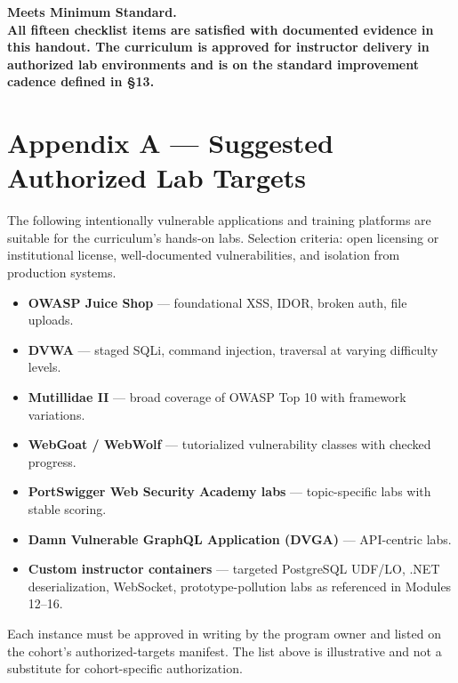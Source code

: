 \documentclass[11pt,letterpaper,oneside]{report}
\begin{document}
\vspace{8pt}

\begin{tcolorbox}[callout,colback=afteal!8,colframe=afteal,colbacktitle=afteal,title=Overall Rating]
\sffamily\bfseries\large Meets Minimum Standard.\\[2pt]
\normalfont All fifteen checklist items are satisfied with documented evidence in this handout. The curriculum is approved for instructor delivery in authorized lab environments and is on the standard improvement cadence defined in \S13.
\end{tcolorbox}

\chapter*{Appendix A --- Suggested Authorized Lab Targets}

The following intentionally vulnerable applications and training platforms are suitable for the curriculum's hands-on labs. Selection criteria: open licensing or institutional license, well-documented vulnerabilities, and isolation from production systems.

\begin{itemize}
  \item \textbf{OWASP Juice Shop} --- foundational XSS, IDOR, broken auth, file uploads.
  \item \textbf{DVWA} --- staged SQLi, command injection, traversal at varying difficulty levels.
  \item \textbf{Mutillidae II} --- broad coverage of OWASP Top 10 with framework variations.
  \item \textbf{WebGoat / WebWolf} --- tutorialized vulnerability classes with checked progress.
  \item \textbf{PortSwigger Web Security Academy labs} --- topic-specific labs with stable scoring.
  \item \textbf{Damn Vulnerable GraphQL Application (DVGA)} --- API-centric labs.
  \item \textbf{Custom instructor containers} --- targeted PostgreSQL UDF/LO, .NET deserialization, WebSocket, prototype-pollution labs as referenced in Modules 12--16.
\end{itemize}

\begin{infobox}
Each instance must be approved in writing by the program owner and listed on the cohort's authorized-targets manifest. The list above is illustrative and not a substitute for cohort-specific authorization.
\end{infobox}
\end{document}
